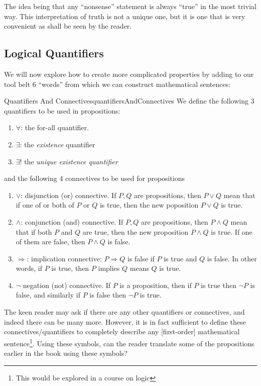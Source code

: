\documentclass{book}
\newcommand{\Rw}{\Rightarrow}
\begin{document}
The idea being that any ``nonsense'' statement is always ``true'' in the most trivial way. This interpretation
of truth is not a unique one, but it is one that is very convenient as shall be seen by the reader.

\subsection*{Logical Quantifiers}

We will now explore how to create more complicated properties by adding to our tool belt $6$ ``words'' from which we can
construct mathematical sentences:
\begin{defn}{Quantifiers And Connectives}{quantifiersAndConnectives}
	We define the following $3$ quantifiers to be used in propositions:
	\begin{enumerate}
		\item $\forall$: the for-all quantifier.
		\item $\exists$: the \emph{existence} quantifier
		\item $\exists!$ the \emph{unique existence quantifier}
	\end{enumerate}
	and the following 4 connectives to be used for propositions
	\begin{enumerate}
		\item $\vee$: disjunction (or) connective. If $P, Q$ are propositions, then $P\vee Q$ mean that if
			one of or both of $P$ or $Q$ is true, then the new poposition $P\vee Q$ is true.
		\item $\wedge$: conjunction (and) connective. If $P, Q$ are propositions, then $P\wedge Q$ mean that if
			 both $P$ and $Q$ are true, then the new proposition $P\wedge Q$ is true. If one of them are
			 false, then $P\wedge Q$ is false.
		 \item $\Rightarrow$: implication connective: $P \Rw Q$ is false if $P$ is true and $Q$ is false. In
			 other words, if $P$ is true, then $P$ implies $Q$ means $Q$ is true.
		 \item $\neg$ negation (not) connective. If $P$ is a proposition, then if $P$ is true then $\neg P$ is
			 false, and similarly if $P$ is false then $\neg P$ is true.
	\end{enumerate}
\end{defn}

The keen reader may ask if there are any other quantifiers or connectives, and indeed there can be many more.
However, it is in fact sufficient to define these connectives/quantifiers to completely describe any
[first-order] mathematical sentence\footnote{This would be explored in a course on logic}. Using these
symbols, can the reader translate some of the propositions earlier in the book using these symbols?
\end{document}
